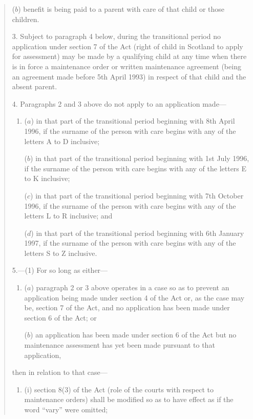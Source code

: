 \documentclass[a4paper]{article}
\begin{document}
\begin{quotation}
\begin{enumerate}
($b$) benefit is being paid to a parent with care of that child or those children.
\end{enumerate}

\medskip

3.  Subject to paragraph 4 below, during the transitional period no application under section 7 of the Act (right of child in Scotland to apply for assessment) may be made by a qualifying child at any time when there is in force a maintenance order or written maintenance agreement (being an agreement made before 5th April 1993) in respect of that child and the absent parent.

\medskip

4.  Paragraphs 2 and 3 above do not apply to an application made—
\begin{enumerate}\item[]
($a$) in that part of the transitional period beginning with 8th April 1996, if the surname of the person with care begins with any of the letters A to D inclusive;

($b$) in that part of the transitional period beginning with 1st July 1996, if the surname of the person with care begins with any of the letters E to K inclusive;

($c$) in that part of the transitional period beginning with 7th October 1996, if the surname of the person with care begins with any of the letters L to R inclusive; and

($d$) in that part of the transitional period beginning with 6th January 1997, if the surname of the person with care begins with any of the letters S to Z inclusive.
\end{enumerate}

5.—(1) For so long as either—
\begin{enumerate}\item[]
($a$) paragraph 2 or 3 above operates in a case so as to prevent an application being made under section 4 of the Act or, as the case may be, section 7 of the Act, and no application has been made under section 6 of the Act; or

($b$) an application has been made under section 6 of the Act but no maintenance assessment has yet been made pursuant to that application,
\end{enumerate}
then in relation to that case—
\begin{enumerate}\item[]
(i) section 8(3) of the Act (role of the courts with respect to maintenance orders) shall be modified so as to have effect as if the word “vary” were omitted;


\end{enumerate}
\end{quotation}
\end{document}
